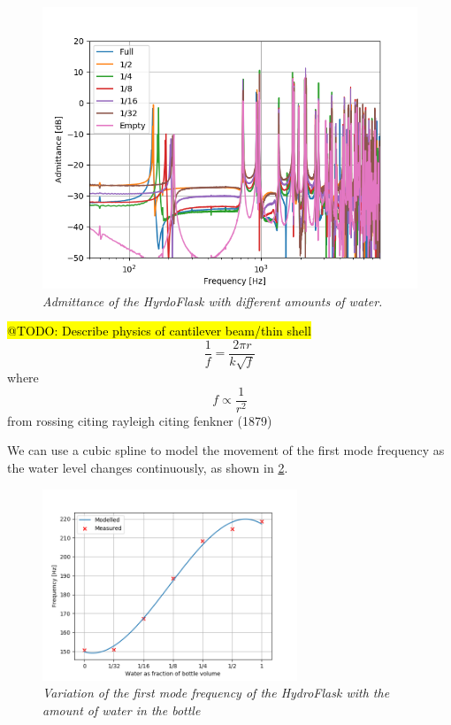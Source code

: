 \documentclass[twoside,a4paper]{article}
\begin{document}
%
\begin{figure}[!htb]
    \centering
    \includegraphics[width=\linewidth,trim={0 0 1cm 1cm},clip]{../Figures/DifferentLevels/HydroWaterLevelsAdmitt}
    \caption{\it{Admittance of the HyrdoFlask with different amounts of water.}}
    \label{fig:hydro-different-water-levels}
\end{figure}
%

\hl{@TODO: Describe physics of cantilever beam/thin shell}
\begin{equation}
    \frac{1}{f} = \frac{2\pi r}{k\sqrt{f}}
\end{equation}
where 
\begin{equation}
    f \propto \frac{1}{r^2}
\end{equation}
from rossing citing rayleigh citing fenkner (1879)
%

We can use a cubic spline to model the movement of the first
mode frequency as the water level changes continuously, as
shown in \cref{fig:water-mode-freq}.
%
\begin{figure}[!htb]
    \centering
    \includegraphics[width=3in]{../Figures/Water_Freq}
    \caption{\it{Variation of the first mode frequency of the HydroFlask
                with the amount of water in the bottle}}
    \label{fig:water-mode-freq}
\end{figure}
%
\end{document}
